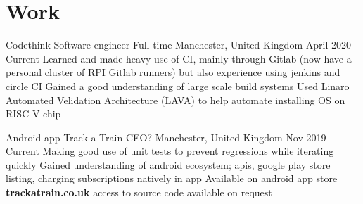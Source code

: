 \documentclass{my_cv}
\begin{document}
\section{Work}

\workDetails
{Codethink}
{Software engineer}
{Full-time}
{Manchester, United Kingdom}
{April 2020 - Current}
\workdetails
{Learned and made heavy use of CI, mainly through Gitlab (now have a personal cluster of RPI Gitlab runners) but also experience using jenkins and circle CI}
{Gained a good understanding of large scale build systems}
{Used Linaro Automated Velidation Architecture (LAVA) to help automate installing OS on RISC-V chip}
\stopworkdetails

\workDetails
{Android app}
{Track a Train}
{CEO? }
{Manchester, United Kingdom}
{Nov 2019 - Current}
\workdetails
{Making good use of unit tests to prevent regressions while iterating quickly}
{Gained understanding of android ecosystem; apis, google play store listing, charging subscriptions natively in app}
{Available on android app store \textbf{trackatrain.co.uk} access to source code available on request}
\stopworkdetails
\end{document}
